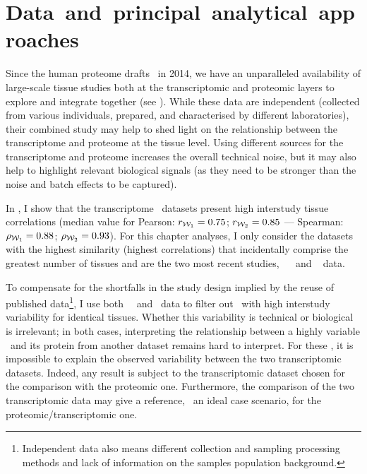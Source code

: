 \section{Data~and~principal~analytical~approaches}\label{sec:IntegrationData}
Since the human proteome drafts~ in 2014,
we have an unparalleled availability of large-scale tissue studies
both at the transcriptomic and proteomic layers to explore and integrate together
(see ).
While these data are independent
(collected from various individuals, prepared,
and characterised by different laboratories),
their combined study may help
to shed light on the relationship
between the transcriptome and proteome at the tissue level.
Using different sources for the transcriptome and proteome
increases the overall technical noise,
but it may also help to highlight relevant biological signals (as
they need to be stronger than the noise and batch effects to be captured).\mybr\

In , I show that
the transcriptome \Rnaseq\ datasets present high interstudy tissue correlations
(median value for Pearson: $r_{\mathcal{W}_1}=0.75$; $r_{\mathcal{W}_2}=0.85$ ---
Spearman: $\rho_{\mathcal{W}_1}=0.88$; $\rho_{\mathcal{W}_2}=0.93$).
For this chapter analyses,
I only consider the datasets with the highest similarity
(highest correlations)
that incidentally comprise the greatest number of tissues
and are the two most recent studies,
\ie\ ~
and \gtex{}~ data.\mybr\

To compensate for the shortfalls in the study design implied
by the reuse of published data\footnote{%
Independent data also means
different collection and sampling processing methods and
lack of information on the samples population background.},
I use both \uhlen\ \etal\ and \gtex\ data
to filter out \mRNAs\ with high interstudy variability for identical tissues.
Whether this variability is technical or biological is irrelevant;
in both cases,
interpreting the relationship
between a highly variable \mRNAs\ and its protein from another dataset
remains hard to interpret.
For these \mRNAs,
it is impossible to explain the observed variability
between the two transcriptomic datasets.
Indeed, any result is subject to the transcriptomic dataset chosen
for the comparison with the proteomic one.
Furthermore, the comparison of the two transcriptomic data may give a reference,
\ie\ an ideal case scenario, for the proteomic/transcriptomic one.\mybr\

